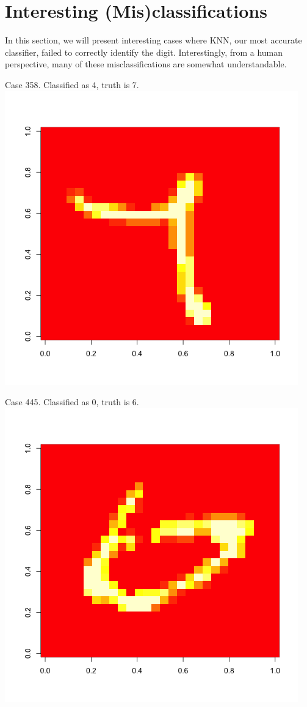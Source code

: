 \documentclass[10pt]{extarticle}
\begin{document}
\section {Interesting (Mis)classifications}

In this section, we will present interesting cases where KNN, our most accurate classifier, failed to correctly identify the digit. Interestingly, from a human perspective, many of these misclassifications are somewhat understandable. 

Case 358. Classified as 4, truth is 7. 
\includegraphics[scale=.4] {../Images/358.png} 

Case 445. Classified as 0, truth is 6. 
\includegraphics[scale=.4] {../Images/445.png}
\end{document}
